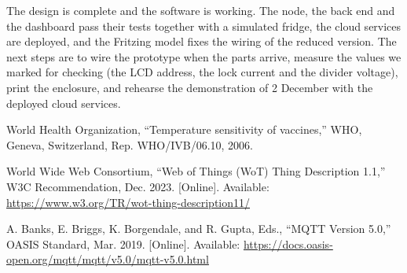 \documentclass[conference,12pt]{IEEEtran}
\newif\ifnotes \notesfalse
\newcommand{\note}[1]{\ifnotes%
  \par\medskip
  {\leftskip=1.2em\rightskip=1.2em\small\itshape\color{noteRed}#1\par}%
  \medskip\fi}
\begin{document}
The design is complete and the software is working. The node, the back end and the dashboard pass
their tests together with a simulated fridge, the cloud services are deployed, and the Fritzing
model fixes the wiring of the reduced version. The next steps are to wire the prototype when the
parts arrive, measure the values we marked for checking (the LCD address, the lock current and the
divider voltage), print the enclosure, and rehearse the demonstration of 2 December with the
deployed cloud services.

\note{The code is on GitHub, shared with the TA. The report contains no code, as the manual asks.}


\flushbottom %
\begin{thebibliography}{3}

World Health Organization, ``Temperature sensitivity of vaccines,'' WHO, Geneva, Switzerland,
Rep. WHO/IVB/06.10, 2006.

World Wide Web Consortium, ``Web of Things (WoT) Thing Description 1.1,'' W3C Recommendation,
Dec. 2023. [Online]. Available: \url{https://www.w3.org/TR/wot-thing-description11/}

A. Banks, E. Briggs, K. Borgendale, and R. Gupta, Eds., ``MQTT Version 5.0,'' OASIS Standard,
Mar. 2019. [Online]. Available:
\url{https://docs.oasis-open.org/mqtt/mqtt/v5.0/mqtt-v5.0.html}

\end{thebibliography}
\end{document}
